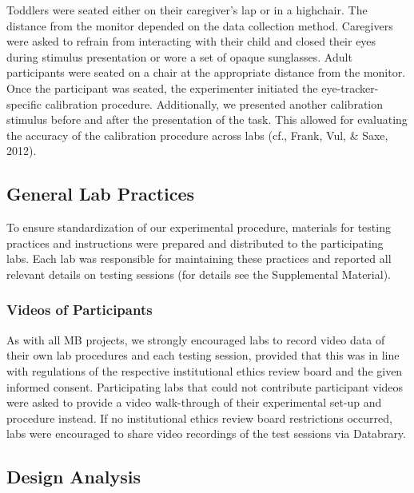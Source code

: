 \documentclass[
  man,floatsintext]{apa6}
\begin{document}
Toddlers were seated either on their caregiver's lap or in a highchair. The distance from the monitor depended on the data collection method. Caregivers were asked to refrain from interacting with their child and closed their eyes during stimulus presentation or wore a set of opaque sunglasses. Adult participants were seated on a chair at the appropriate distance from the monitor. Once the participant was seated, the experimenter initiated the eye-tracker-specific calibration procedure. Additionally, we presented another calibration stimulus before and after the presentation of the task. This allowed for evaluating the accuracy of the calibration procedure across labs (cf., Frank, Vul, \& Saxe, 2012).

\subsection{General Lab Practices}\label{general-lab-practices}

To ensure standardization of our experimental procedure, materials for testing practices and instructions were prepared and distributed to the participating labs. Each lab was responsible for maintaining these practices and reported all relevant details on testing sessions (for details see the Supplemental Material).

\subsubsection{Videos of Participants}\label{videos-of-participants}

As with all MB projects, we strongly encouraged labs to record video data of their own lab procedures and each testing session, provided that this was in line with regulations of the respective institutional ethics review board and the given informed consent. Participating labs that could not contribute participant videos were asked to provide a video walk-through of their experimental set-up and procedure instead. If no institutional ethics review board restrictions occurred, labs were encouraged to share video recordings of the test sessions via Databrary.

\subsection{Design Analysis}\label{design-analysis}
\end{document}
